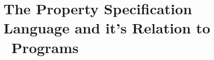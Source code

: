 \section{The Property Specification Language and it's Relation to \gwendolen\ Programs}

{
  \let\section\subsection
  \let\subsection\subsubsection
  \let\subsubsection\paragraph
  
  
  }
